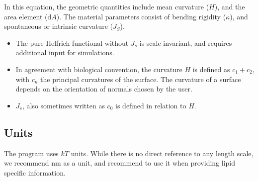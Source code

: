\documentclass[11pt]{article}
\begin{document}
In this equation, the geometric quantities include mean curvature ($H$), and the area element ($\mathrm{d}A$). The material parameters consist of bending rigidity ($\kappa$), and spontaneous or intrinsic curvature ($J_S$). 
\begin{tcolorbox}[colback=orange!5!white,colframe=orange!75!black,title=Clarification]
\begin{itemize}
    \item The pure Helfrich functional without $J_s$ is scale invariant, and requires additional input for simulations. 
    \item In agreement with biological convention, the curvature $H$ is defined as $c_1 + c_2$, with $c_n$ the principal curvatures of the surface. The curvature of a surface depends on the orientation of normals chosen by the user. 
    \item $J_s$, also sometimes written as $c_0$ is defined in relation to $H$.
\end{itemize}
\end{tcolorbox}
\subsection{Units}
The program uses $kT$ units. While there is no direct reference to any length scale, we recommend \textrm{nm} as a unit, and recommend to use it when providing lipid specific information. 
\end{document}
